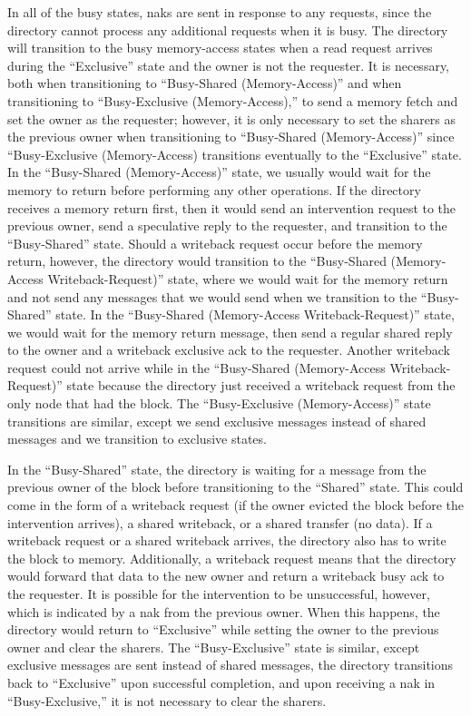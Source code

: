 \documentclass[letterpaper]{article}
\begin{document}
In all of the busy states, naks are sent in response to any requests, since the directory cannot process any additional requests when it is busy. The directory will transition to the busy memory-access states when a read request arrives during the ``Exclusive'' state and the owner is not the requester. It is necessary, both when transitioning to ``Busy-Shared (Memory-Access)'' and when transitioning to ``Busy-Exclusive (Memory-Access),'' to send a memory fetch and set the owner as the requester; however, it is only necessary to set the sharers as the previous owner when transitioning to ``Busy-Shared (Memory-Access)'' since ``Busy-Exclusive (Memory-Access) transitions eventually to the ``Exclusive'' state. In the ``Busy-Shared (Memory-Access)'' state, we usually would wait for the memory to return before performing any other operations. If the directory receives a memory return first, then it would send an intervention request to the previous owner, send a speculative reply to the requester, and transition to the ``Busy-Shared'' state. Should a writeback request occur before the memory return, however, the directory would transition to the ``Busy-Shared (Memory-Access Writeback-Request)'' state, where we would wait for the memory return and not send any messages that we would send when we transition to the ``Busy-Shared'' state. In the ``Busy-Shared (Memory-Access Writeback-Request)'' state, we would wait for the memory return message, then send a regular shared reply to the owner and a writeback exclusive ack to the requester. Another writeback request could not arrive while in the ``Busy-Shared (Memory-Access Writeback-Request)'' state because the directory just received a writeback request from the only node that had the block. The ``Busy-Exclusive (Memory-Access)'' state transitions are similar, except we send exclusive messages instead of shared messages and we transition to exclusive states.

In the ``Busy-Shared'' state, the directory is waiting for a message from the previous owner of the block before transitioning to the ``Shared'' state. This could come in the form of a writeback request (if the owner evicted the block before the intervention arrives), a shared writeback, or a shared transfer (no data). If a writeback request or a shared writeback arrives, the directory also has to write the block to memory. Additionally, a writeback request means that the directory would forward that data to the new owner and return a writeback busy ack to the requester. It is possible for the intervention to be unsuccessful, however, which is indicated by a nak from the previous owner. When this happens, the directory would return to ``Exclusive'' while setting the owner to the previous owner and clear the sharers. The ``Busy-Exclusive'' state is similar, except exclusive messages are sent instead of shared messages, the directory transitions back to ``Exclusive'' upon successful completion, and upon receiving a nak in ``Busy-Exclusive,'' it is not necessary to clear the sharers.
\end{document}
